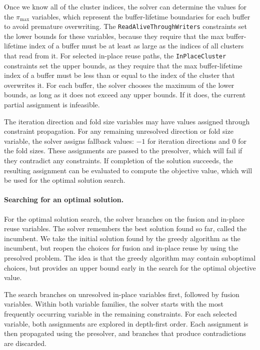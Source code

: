 Once we know all of the cluster indices, the solver can determine the values for the $\pi_{\max}$ variables, which represent the buffer-lifetime boundaries for each buffer to avoid premature overwriting.
The \texttt{ReadAliveThroughWriters} constraints set the lower bounds for these variables, because they require that the max buffer-lifetime index of a buffer must be at least as large as the indices of all clusters that read from it.
For selected in-place reuse paths, the \texttt{InPlaceCluster} constraints set the upper bounds, as they require that the max buffer-lifetime index of a buffer must be less than or equal to the index of the cluster that overwrites it.
For each buffer, the solver chooses the maximum of the lower bounds, as long as it does not exceed any upper bounds.
If it does, the current partial assignment is infeasible.

The iteration direction and fold size variables may have values assigned through constraint propagation.
For any remaining unresolved direction or fold size variable, the solver assigns fallback values: $-1$ for iteration directions and $0$ for the fold sizes.
These assignments are passed to the presolver, which will fail if they contradict any constraints.
If completion of the solution succeeds, the resulting assignment can be evaluated to compute the objective value, which will be used for the optimal solution search.

\paragraph{Searching for an optimal solution.}

For the optimal solution search, the solver branches on the fusion and in-place reuse variables.
The solver remembers the best solution found so far, called the incumbent.
We take the initial solution found by the greedy algorithm as the incumbent, but reopen the choices for fusion and in-place reuse by using the presolved problem.
The idea is that the greedy algorithm may contain suboptimal choices, but provides an upper bound early in the search for the optimal objective value.

The search branches on unresolved in-place variables first, followed by fusion variables.
Within both variable families, the solver starts with the most frequently occurring variable in the remaining constraints.
For each selected variable, both assignments are explored in depth-first order.
Each assignment is then propagated using the presolver, and branches that produce contradictions are discarded.

